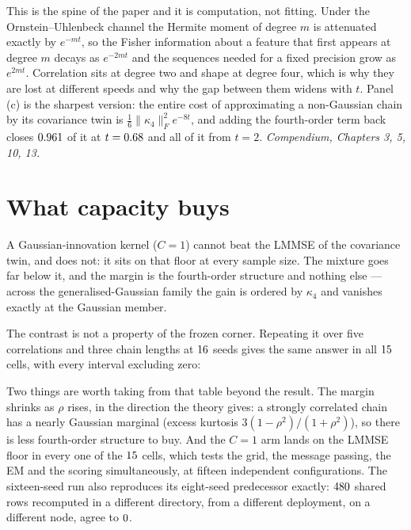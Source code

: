 \documentclass[11pt,a4paper]{article}
\newcommand{\corr}{\rho}
\newcommand{\ncomp}{C}
\newcommand{\comp}[1]{{\small\textit{Compendium, #1.}}}
\begin{document}
\noindent
This is the spine of the paper and it is computation, not fitting. Under the
Ornstein--Uhlenbeck channel the Hermite moment of degree $m$ is attenuated exactly by $e^{-mt}$,
so the Fisher information about a feature that first appears at degree $m$ decays as $e^{-2mt}$
and the sequences needed for a fixed precision grow as $e^{2mt}$. Correlation sits at degree two
and shape at degree four, which is why they are lost at different speeds and why the gap between
them widens with $t$. Panel (c) is the sharpest version: the entire cost of approximating a
non-Gaussian chain by its covariance twin is $\tfrac16\|\kappa_4\|_F^2e^{-8t}$, and adding the
fourth-order term back closes $0.961$ of it at
$t=0.68$ and all of it from $t=2$.
\comp{Chapters 3, 5, 10, 13}

\section{What capacity buys}



\noindent
A Gaussian-innovation kernel ($\ncomp=1$) cannot beat the LMMSE of the covariance twin, and does
not: it sits on that floor at every sample size. The mixture goes far below it, and the margin is
the fourth-order structure and nothing else --- across the generalised-Gaussian family the gain is
ordered by $\kappa_4$ and vanishes exactly at the Gaussian member.

The contrast is not a property of the frozen corner. Repeating it over five correlations and three
chain lengths at $\regSeeds$ seeds gives the same answer in all $\regCells$ cells, with every
interval excluding zero:

\begin{table}[H]
\centering\small
\caption{Capacity across regimes (\textsc{e13x}, $\regSeeds$ seeds). Last column: the paired
difference $\ncomp=8$ minus $\ncomp=1$, negative in favour of the mixture. The $\ncomp=1$ column
against the \textsc{lmmse} column is Proposition~1 checked at every cell --- they agree to
$\regIdentMax$ in the worst of the $\regCells$.}

\end{table}

\noindent
Two things are worth taking from that table beyond the result. The margin shrinks as $\corr$ rises,
in the direction the theory gives: a strongly correlated chain has a nearly Gaussian marginal
(excess kurtosis $3(1-\corr^2)/(1+\corr^2)$), so there is less fourth-order structure
to buy. And the $\ncomp=1$ arm lands on the LMMSE floor in every one of the $\regCells$ cells,
which tests the grid, the message passing, the EM and the scoring simultaneously, at fifteen
independent configurations. The sixteen-seed run also reproduces its eight-seed predecessor
exactly: $480$ shared rows recomputed in a different directory, from a different
deployment, on a different node, agree to $0$.
\end{document}
